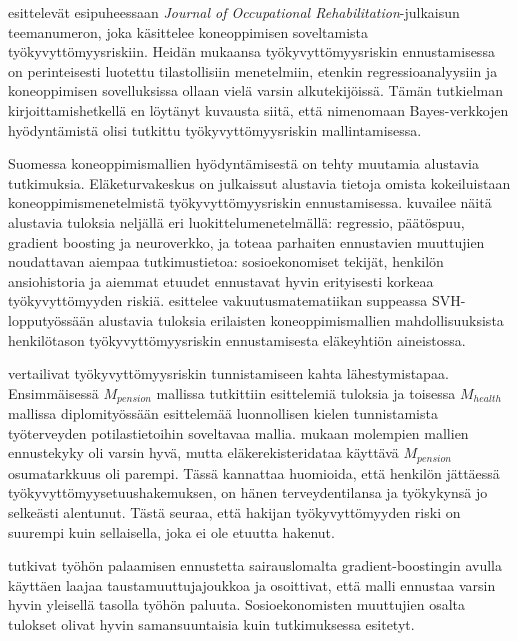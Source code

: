 \citet{gross_machine_2020} esittelevät esipuheessaan \emph{Journal of Occupational Rehabilitation}-julkaisun teemanumeron, joka käsittelee koneoppimisen soveltamista työkyvyttömyysriskiin. Heidän mukaansa työkyvyttömyysriskin ennustamisessa on perinteisesti luotettu tilastollisiin menetelmiin, etenkin regressioanalyysiin ja koneoppimisen sovelluksissa ollaan vielä varsin alkutekijöissä. Tämän tutkielman kirjoittamishetkellä en löytänyt kuvausta siitä, että nimenomaan Bayes-verkkojen hyödyntämistä olisi tutkittu työkyvyttömyysriskin mallintamisessa. 

Suomessa koneoppimismallien hyödyntämisestä on tehty muutamia alustavia tutkimuksia. Eläketurvakeskus on julkaissut alustavia tietoja omista kokeiluistaan koneoppimismenetelmistä työkyvyttömyysriskin ennustamisessa. \citet{varis_aketurvakeskuksen_2018} kuvailee näitä alustavia tuloksia neljällä eri luokittelumenetelmällä: regressio, päätöspuu, gradient boosting \citep{friedman_greedy_2001} ja neuroverkko, ja toteaa parhaiten ennustavien muuttujien noudattavan aiempaa tutkimustietoa: sosioekonomiset tekijät, henkilön ansiohistoria ja aiemmat etuudet ennustavat hyvin erityisesti korkeaa työkyvyttömyyden riskiä. \citet{sami_tyokyvyttomyyselakeratkaisun_2022} esittelee vakuutusmatematiikan suppeassa SVH-lopputyössään alustavia tuloksia erilaisten koneoppimismallien mahdollisuuksista henkilötason työkyvyttömyysriskin ennustamisesta eläkeyhtiön aineistossa.

\citet{saarela_work_2022} vertailivat työkyvyttömyysriskin tunnistamiseen kahta lähestymistapaa. Ensimmäisessä $M_{pension}$ mallissa tutkittiin \citet{varis_aketurvakeskuksen_2018} esittelemiä tuloksia ja toisessa $M_{health}$ mallissa \citet{huhta-koivisto_work_2020} diplomityössään esittelemää luonnollisen kielen tunnistamista työterveyden potilastietoihin soveltavaa mallia. \citet{saarela_work_2022} mukaan molempien mallien ennustekyky oli varsin hyvä, mutta eläkerekisteridataa käyttävä $M_{pension}$ osumatarkkuus oli parempi. Tässä kannattaa huomioida, että henkilön jättäessä työkyvyttömyysetuushakemuksen, on hänen terveydentilansa ja työkykynsä jo selkeästi alentunut. Tästä seuraa, että hakijan työkyvyttömyyden riski on suurempi kuin sellaisella, joka ei ole etuutta hakenut. 

\citet{na_machine_nodate} tutkivat työhön palaamisen ennustetta sairauslomalta gradient-boostingin avulla käyttäen laajaa taustamuuttujajoukkoa ja osoittivat, että malli ennustaa varsin hyvin yleisellä tasolla työhön paluuta. Sosioekonomisten muuttujien osalta tulokset olivat hyvin samansuuntaisia kuin \citet{karolaakso_contextual_2021, karolaakso_socioeconomic_2020} tutkimuksessa esitetyt. 

